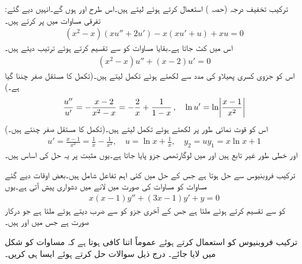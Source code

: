 :ترکیب تخفیف درجہ (حصہ ) استعمال کرتے ہوئے  لیتے ہیں۔اس طرح  اور  ہوں گے۔انہیں دیے گئے تفرقی مساوات میں پر کرتے ہیں۔
\begin{align*}
(x^2-x)(xu''+2u')-x(xu'+u)+xu=0
\end{align*}
اس میں  کٹ جاتا ہے۔بقایا مساوات کو  سے تقسیم کرتے ہوئے ترتیب دیتے ہیں۔
\begin{align*}
(x^2-x)u''+(x-2)u'=0
\end{align*}
اس کو جزوی کسری پھیلاو کی مدد سے لکھتے ہوئے تکمل لیتے ہیں۔(تکمل کا مستقل صفر چننا گیا ہے۔)
\begin{align*}
\frac{u''}{u'}=-\frac{x-2}{x^2-x}=-\frac{2}{x}+\frac{1}{1-x}\,,\quad \ln u'=\ln \abs{\frac{x-1}{x^2}}
\end{align*}
اس کو قوت نمائی طور پر لکھتے ہوئے تکمل لیتے ہیں۔(تکمل کا مستقل صفر چنتے ہیں۔)
\begin{align*}
u'=\frac{x-1}{x^2}=\frac{1}{x}-\frac{1}{x^2}, \quad u=\ln x+\frac{1}{x}, \quad y_2=uy_1=x\ln x+1
\end{align*}
 اور  خطی طور غیر تابع ہیں اور  میں لوگارتھمی جزو پایا جاتا ہے۔یوں مثبت  پر یہ حل کی اساس ہیں۔

ترکیب فروبنیوس سے  حل ہوتا ہے جس کے حل میں کئی اہم تفاعل شامل ہیں۔بعض اوقات دیے گئے مساوات کو مساوات  کی صورت میں لانے میں دشواری پیش آتی ہے۔یوں 
\begin{align*}
x(x-1)y''+(3x-1)y'+y=0
\end{align*}
کو  سے تقسیم کرتے ہوئے   ملتا ہے جس کے آخری جزو کو  سے ضرب دیتے ہوئے  ملتا ہے جو درکار صورت ہے جس میں  اور  ہیں۔ 

ترکیب فروبنیوس کو استعمال کرتے ہوئے عموماً اتنا کافی ہوتا ہے کہ مساوات کو  شکل میں لایا جائے۔ درج ذیل سوالات حل کرتے ہوئے ایسا ہی کریں۔

